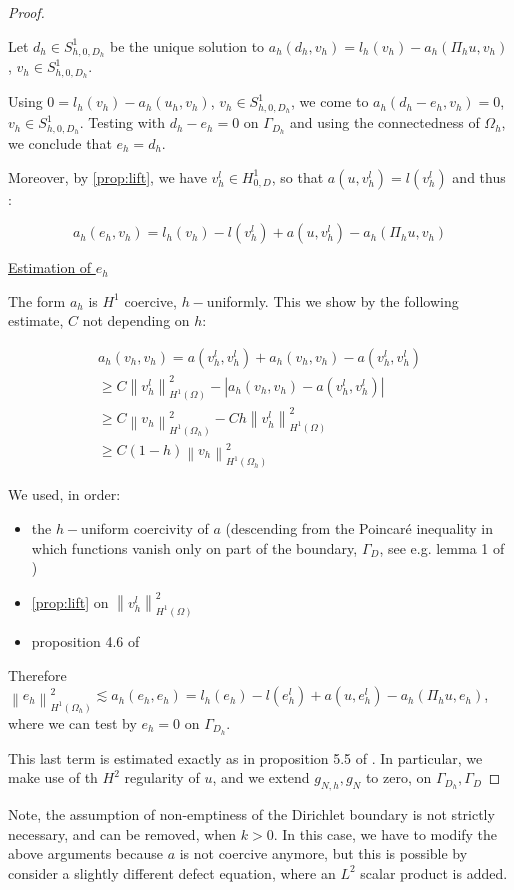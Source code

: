 \documentclass[english,a4paper,9pt,oneside]{scrbook}	%
\theoremstyle{break}
\newenvironment{mproof}[1][\proofname]{%
  \begin{proof}[#1]$ $\par\nobreak\ignorespaces
}{%
  \end{proof}
}
\renewcommand*{\proofname}{Proof}
\theoremstyle{remark}
\newcommand{\norm}[1]{\left\lVert#1\right\rVert}
\begin{document}
\begin{appendices}
\begin{mproof}
Let $d_h \in S^1_{h,0,D_h}$ be the unique solution to $a_h(d_h,v_h)=l_h(v_h)-a_h(\Pi_h u,v_h)$, $v_h \in S^1_{h,0,D_h}$.

Using $0 = l_h(v_h)-a_h(u_h,v_h)$, $v_h \in S^1_{h,0,D_h}$, we come to $a_h(d_h-e_h,v_h)=0$,  $v_h \in S^1_{h,0,D_h}$. Testing with $d_h-e_h=0$ on $\Gamma_{D_h}$ and using the connectedness of $\Omega_h$, we conclude that $e_h=d_h$.

Moreover, by \cref{prop:lift}, we have $v_h^l \in H^1_{0,D}$, so that $a(u,v_h^l) = l(v_h^l)$ and thus :

$$a_h(e_h,v_h) = l_h(v_h)-l(v_h^l) + a(u,v_h^l)-a_h(\Pi_h u, v_h)$$

\underline{Estimation of $e_h$}

The form $a_h$ is $H^1$ coercive, $h-$uniformly. This we show by the following estimate, $C$ not depending on $h$:

\begin{align*}
a_h(v_h,v_h) = a(v_h^l,v_h^l) + a_h(v_h,v_h) - a(v_h^l,v_h^l)\\
\geq C\norm{v_h^l}_{H^1(\Omega)}^2 - |a_h(v_h,v_h) - a(v_h^l,v_h^l)|\\
\geq C\norm{v_h}_{H^1(\Omega_h)}^2 -C h \norm{v_h^l}_{H^1(\Omega)}^2\\
\geq C(1-h)\norm{v_h}_{H^1(\Omega_h)}^2
\end{align*} 

We used, in order:
\begin{itemize}
	\item  the $h-$uniform coercivity of $a$ (descending from the Poincaré inequality in which functions vanish only on part of the boundary, $\Gamma_D$, see e.g. lemma 1 of \cite{dorfler})
	\item \cref{prop:lift} on $\norm{v_h^l}_{H^1(\Omega)}^2$
	\item proposition 4.6 of \cite{edelmann}
\end{itemize}

Therefore $\norm{e_h}^2_{H^1(\Omega_h)}\lesssim a_h(e_h,e_h) = l_h(e_h)-l(e_h^l) + a(u,e_h^l)-a_h(\Pi_h u, e_h)$, where we can test by $e_h=0$ on $\Gamma_{D_h}$.

This last term is estimated exactly as in proposition 5.5 of \cite{edelmann}. In particular, we make use of th $H^2$ regularity of $u$, and we extend $g_{N,h}, g_N$ to zero, on $\Gamma_{D_h}, \Gamma_D$

\end{mproof}


Note, the assumption of non-emptiness of the Dirichlet boundary is not strictly necessary, and can be removed, when $k>0$. In this case, we have to modify the above arguments because $a$ is not coercive anymore, but this is possible by consider a slightly different defect equation, where an $L^2$ scalar product is added.



\end{appendices}
\end{document}
